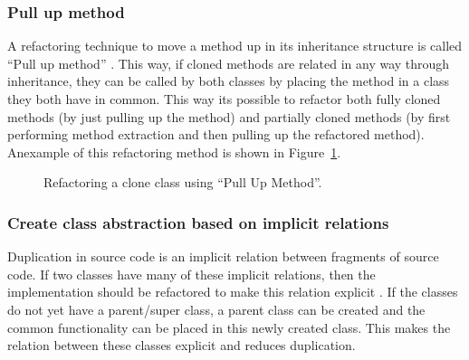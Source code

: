 \subsubsection{Pull up method}
A refactoring technique to move a method up in its inheritance structure is called ``Pull up method'' \cite{fowler2018refactoring}. This way, if cloned methods are related in any way through inheritance, they can be called by both classes by placing the method in a class they both have in common. This way its possible to refactor both fully cloned methods (by just pulling up the method) and partially cloned methods (by first performing method extraction and then pulling up the refactored method). Anexample of this refactoring method is shown in Figure~\ref{fig:pullupmethod}.

\begin{figure}[H]
\begin{parcolumns}{2}
\end{parcolumns}
\caption{Refactoring a clone class using ``Pull Up Method''.}
\label{fig:pullupmethod}
\end{figure}

\subsubsection{Create class abstraction based on implicit relations}
Duplication in source code is an implicit relation between fragments of source code. If two classes have many of these implicit relations, then the implementation should be refactored to make this relation explicit \cite{fowler2018refactoring}. If the classes do not yet have a parent/super class, a parent class can be created and the common functionality can be placed in this newly created class. This makes the relation between these classes explicit and reduces duplication.

